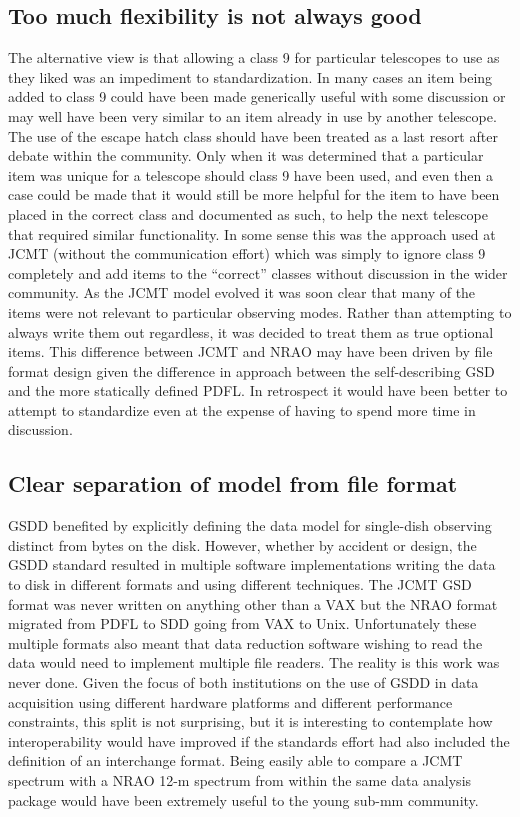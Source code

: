 \documentclass[final,authoryear,5p,times,twocolumn]{elsarticle}
\begin{document}
\subsection{Too much flexibility is not always good}

The alternative view is that allowing a class 9 for particular
telescopes to use as they liked was an impediment to
standardization. In many cases an item being added to class 9 could have been
made generically useful with some discussion or may well have been very
similar to an item already in use by another telescope. The use of the
escape hatch class should have been treated as a last resort after debate
within the community. Only when it was determined that a
particular item was unique for a telescope should class 9 have been used, and
even then a case could be made that it would still be more helpful for
the item to have been placed in the correct class and documented as such, to
help the next telescope that required similar functionality. In some
sense this was the approach used at JCMT (without the communication
effort) which was simply to ignore class 9 completely and add items to
the ``correct'' classes without discussion in the wider
community. As the JCMT model evolved it was soon clear that many of
the items were not relevant to particular observing modes. Rather than
attempting to always write them out regardless, it was decided to
treat them as true optional items. This difference between JCMT and
NRAO may have been driven by file format design given the difference
in approach between the self-describing GSD and the more statically
defined PDFL.  In retrospect it would have been better to attempt to
standardize even at the expense of having to spend more time in
discussion.

\subsection{Clear separation of model from file format}

GSDD benefited by explicitly defining the
data model for single-dish observing distinct from bytes on the
disk. However, whether by accident or design, the GSDD standard resulted in multiple
software implementations writing the data to disk in different formats
and using different techniques. The JCMT GSD format was never written
on anything other than a VAX but the NRAO format migrated from PDFL to
SDD going from VAX to Unix. Unfortunately these multiple formats also
meant that data reduction software
wishing to read the data would need to implement multiple file
readers. The reality is this work was never done. Given the focus of
both institutions on the use of GSDD in data acquisition using
different hardware platforms and different performance constraints,
this split is not surprising, but it is interesting to contemplate how
interoperability would have improved if the standards effort had also
included the definition of an interchange format. Being easily able to
compare a JCMT spectrum with a NRAO 12-m spectrum from within the same
data analysis package would have been extremely useful to the young
sub-mm community.
\end{document}
